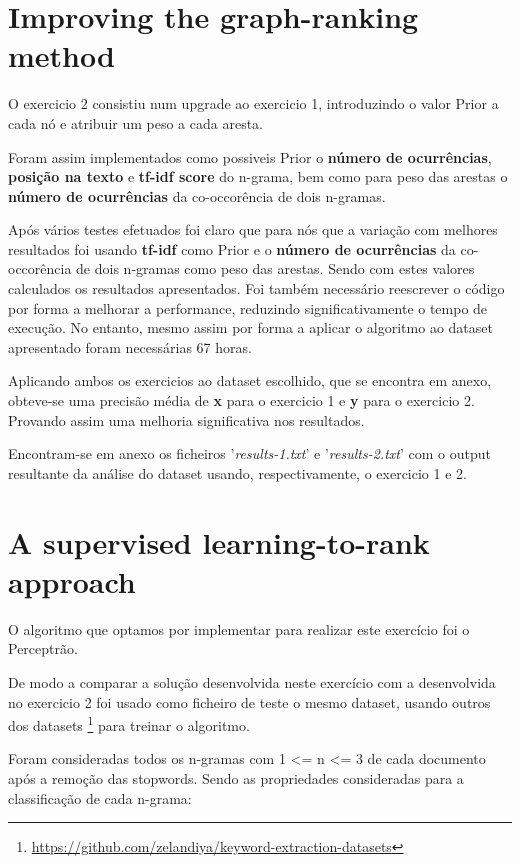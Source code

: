 \documentclass[a4paper,titlepage,11pt]{article}
\begin{document}
\section{Improving the graph-ranking method}
O exercicio 2 consistiu num upgrade ao exercicio 1, introduzindo o valor Prior a cada nó e atribuir um peso a
cada aresta.

Foram assim implementados como possiveis Prior o \textbf{número de ocurrências}, \textbf{posição na texto} e
\textbf{tf-idf score} do n-grama, bem como para peso das arestas o \textbf{número de ocurrências} da co-occorência
de dois n-gramas.

Após vários testes efetuados foi claro que para nós que a variação com melhores resultados foi usando \textbf{tf-idf} como Prior
e o \textbf{número de ocurrências} da co-occorência de dois n-gramas como peso das arestas. Sendo com estes valores calculados
os resultados apresentados. Foi também necessário reescrever o código por forma a melhorar a performance, reduzindo significativamente
o tempo de execução. No entanto, mesmo assim por forma a aplicar o algoritmo ao dataset apresentado foram necessárias 67 horas.

Aplicando ambos os exercicios ao dataset escolhido, que se encontra em anexo, obteve-se uma precisão média de \textbf{x} para o
exercicio 1 e \textbf{y} para o exercicio 2. Provando assim uma melhoria significativa nos resultados.                                  %

Encontram-se em anexo os ficheiros '\textit{results-1.txt}' e '\textit{results-2.txt}' com o output resultante da análise do dataset
usando, respectivamente, o exercicio 1 e 2.

\section{A supervised learning-to-rank approach}
O algoritmo que optamos por implementar para realizar este exercício foi o Perceptrão.

De modo a comparar a solução desenvolvida neste exercício com a desenvolvida no exercicio 2
foi usado como  ficheiro de teste o mesmo dataset, usando outros dos datasets
\footnote{ \href{https://github.com/zelandiya/keyword-extraction-datasets}{https://github.com/zelandiya/keyword-extraction-datasets} }
para treinar o algoritmo.

Foram consideradas todos os n-gramas com 1 \textless= n \textless= 3 de cada documento após a remoção das stopwords.
Sendo as propriedades consideradas para a classificação de cada n-grama:
\end{document}
